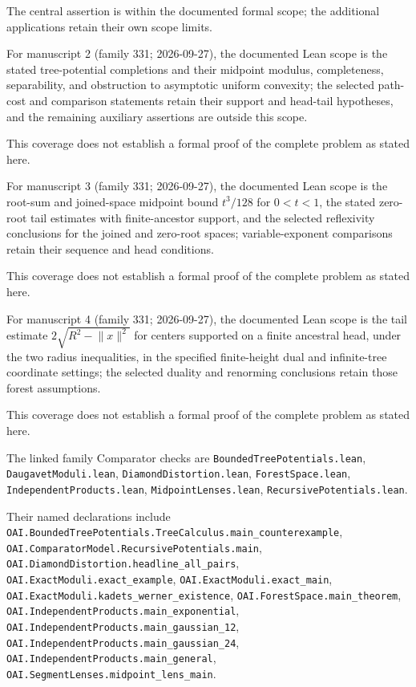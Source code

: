 \documentclass[11pt]{article}
\begin{document}
The central assertion is within the documented formal scope; the additional applications retain their own scope limits.

For manuscript 2 (family 331; 2026-09-27), the documented Lean scope is the stated tree-potential completions and their midpoint modulus, completeness, separability, and obstruction to asymptotic uniform convexity; the selected path-cost and comparison statements retain their support and head-tail hypotheses, and the remaining auxiliary assertions are outside this scope.

This coverage does not establish a formal proof of the complete problem as stated here.

For manuscript 3 (family 331; 2026-09-27), the documented Lean scope is the root-sum and joined-space midpoint bound $t^3/128$ for $0<t<1$, the stated zero-root tail estimates with finite-ancestor support, and the selected reflexivity conclusions for the joined and zero-root spaces; variable-exponent comparisons retain their sequence and head conditions.

This coverage does not establish a formal proof of the complete problem as stated here.

For manuscript 4 (family 331; 2026-09-27), the documented Lean scope is the tail estimate $2\sqrt{R^2-\lVert x\rVert^2}$ for centers supported on a finite ancestral head, under the two radius inequalities, in the specified finite-height dual and infinite-tree coordinate settings; the selected duality and renorming conclusions retain those forest assumptions.

This coverage does not establish a formal proof of the complete problem as stated here.

The linked family Comparator checks are \texttt{BoundedTreePotentials.lean}, \texttt{DaugavetModuli.lean}, \texttt{DiamondDistortion.lean}, \texttt{ForestSpace.lean}, \texttt{IndependentProducts.lean}, \texttt{MidpointLenses.lean}, \texttt{RecursivePotentials.lean}.

Their named declarations include \texttt{OAI.BoundedTreePotentials.TreeCalculus.main\_counterexample}, \texttt{OAI.ComparatorModel.RecursivePotentials.main}, \texttt{OAI.DiamondDistortion.headline\_all\_pairs}, \texttt{OAI.ExactModuli.exact\_example}, \texttt{OAI.ExactModuli.exact\_main}, \texttt{OAI.ExactModuli.kadets\_werner\_existence}, \texttt{OAI.ForestSpace.main\_theorem}, \texttt{OAI.IndependentProducts.main\_exponential}, \texttt{OAI.IndependentProducts.main\_gaussian\_12}, \texttt{OAI.IndependentProducts.main\_gaussian\_24}, \texttt{OAI.IndependentProducts.main\_general}, \texttt{OAI.SegmentLenses.midpoint\_lens\_main}.
\end{document}
